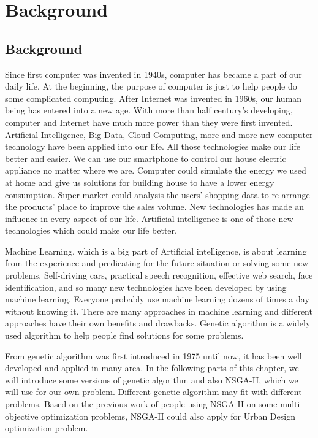 \chapter{Background}
\label{chap:background}

\section{Background}
Since first computer was invented in 1940s, computer has became a part of our daily life. At the beginning, the purpose of computer is just to help people do some complicated computing. After Internet was invented in 1960s, our human being has entered into a new age. With more than half century’s developing, computer and Internet have much more power than they were first invented. Artificial Intelligence, Big Data, Cloud Computing, more and more new computer technology have been applied into our life. All those technologies make our life better and easier. We can use our smartphone to control our house electric appliance no matter where we are. Computer could simulate the energy we used at home and give us solutions for building house to have a lower energy consumption. Super market could analysis the users’ shopping data to re-arrange the products’ place to improve the sales volume. New technologies has made an influence in every aspect of our life. Artificial intelligence is one of those new technologies which could make our life better.

Machine Learning, which is a big part of Artificial intelligence, is about learning from the experience and predicating for the future situation or solving some new problems. Self-driving cars, practical speech recognition, effective web search, face identification, and so many new technologies have been developed by using machine learning. Everyone probably use machine learning dozens of times a day without knowing it. There are many approaches in machine learning and different approaches have their own benefits and drawbacks. Genetic algorithm is a widely used algorithm to help people find solutions for some problems.

From genetic algorithm was first introduced in 1975 until now, it has been well developed and applied in many area. In the following parts of this chapter, we will introduce some versions of genetic algorithm and also NSGA-II, which we will use for our own problem. Different genetic algorithm may fit with different problems. Based on the previous work of people using NSGA-II on some multi-objective optimization problems\cite{Magnier_2010_Multiobjective}, NSGA-II could also apply for Urban Design optimization problem. 


